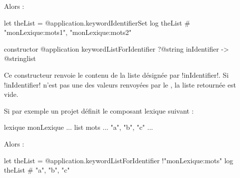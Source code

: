 Alors :
\begin{galgas}
let theList = @application.keywordIdentifierSet
log theList # "monLexique:mots1", "monLexique:mots2"
\end{galgas}






\begin{galgasbox}
constructor @application keywordListForIdentifier
  ?@string inIdentifier
  -> @stringlist
\end{galgasbox}


Ce constructeur renvoie le contenu de la liste désignée par \ggs!inIdentifier!. Si \ggs!inIdentifier! n'est pas une des valeurs renvoyées par le , la liste retournée est vide.


Si par exemple un projet définit le composant lexique suivant :

\begin{galgas}
lexique monLexique {
  ...
  list mots ... { "a", "b", "c" }
  ...
}
\end{galgas}

Alors :
\begin{galgas}
let theList = @application.keywordListForIdentifier {!"monLexique:mots"}
log theList # "a", "b", "c"
\end{galgas}


